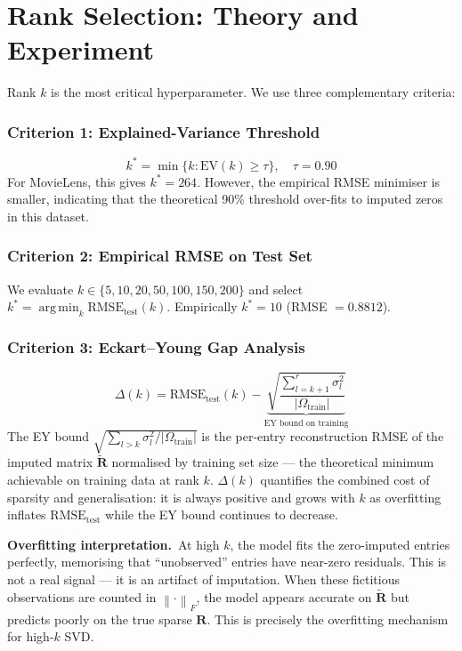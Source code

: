 \documentclass[12pt, a4paper]{article}
\newcommand{\Rmat}{\mathbf{R}}
\newcommand{\norm}[1]{\left\| #1 \right\|}
\newcommand{\Fro}[1]{\norm{#1}_{F}}
\newcommand{\Om}{\Omega}
\DeclareMathOperator*{\argmin}{arg\,min}
\begin{document}
\section{Rank Selection: Theory and Experiment}
\label{sec:ranksel}

Rank $k$ is the most critical hyperparameter.
We use three complementary criteria:

\subsubsection{Criterion 1: Explained-Variance Threshold}
\[
  k^* = \min\bigl\{k : \mathrm{EV}(k) \geq \tau\bigr\}, \quad \tau = 0.90
\]
For MovieLens, this gives $k^* = 264$.
However, the empirical RMSE minimiser is smaller, indicating that
the theoretical 90\% threshold over-fits to imputed zeros in this dataset.

\subsubsection{Criterion 2: Empirical RMSE on Test Set}
We evaluate $k \in \{5,10,20,50,100,150,200\}$ and select
$k^* = \argmin_k \mathrm{RMSE}_{\mathrm{test}}(k)$.
Empirically $k^* = 10$ (RMSE $= 0.8812$).

\subsubsection{Criterion 3: Eckart--Young Gap Analysis}
\begin{equation}
  \Delta(k) = \mathrm{RMSE}_{\mathrm{test}}(k) -
  \underbrace{\sqrt{\frac{\sum_{l=k+1}^r \sigma_l^2}{|\Om_{\mathrm{train}}|}}}_{\text{EY bound on training}}
  \label{eq:eygap}
\end{equation}
The EY bound $\sqrt{\sum_{l>k}\sigma_l^2 / |\Om_{\mathrm{train}}|}$ is the
per-entry reconstruction RMSE of the imputed matrix $\tilde{\Rmat}$
normalised by training set size — the theoretical minimum achievable
on training data at rank $k$.
$\Delta(k)$ quantifies the combined cost of sparsity and generalisation:
it is always positive and grows with $k$ as overfitting inflates
$\mathrm{RMSE}_{\mathrm{test}}$ while the EY bound continues to decrease.

\medskip
\noindent\textbf{Overfitting interpretation.}\
At high $k$, the model fits the zero-imputed entries perfectly,
memorising that ``unobserved'' entries have near-zero residuals.
This is not a real signal — it is an artifact of imputation.
When these fictitious observations are counted in $\Fro{\cdot}$,
the model appears accurate on $\tilde{\Rmat}$ but predicts poorly
on the true sparse $\Rmat$.
This is precisely the overfitting mechanism for high-$k$ SVD.
\end{document}
